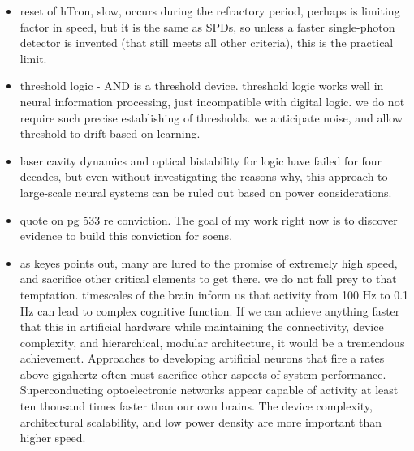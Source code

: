 \documentclass[twocolumn]{article}
\begin{document}
\begin{itemize}
\item reset of hTron, slow, occurs during the refractory period, perhaps is limiting factor in speed, but it is the same as SPDs, so unless a faster single-photon detector is invented (that still meets all other criteria), this is the practical limit.
\item threshold logic - AND is a threshold device. threshold logic works well in neural information processing, just incompatible with digital logic. we do not require such precise establishing of thresholds. we anticipate noise, and allow threshold to drift based on learning. 
\item laser cavity dynamics and optical bistability for logic have failed for four decades, but even without investigating the reasons why, this approach to large-scale neural systems can be ruled out based on power considerations. 
\item \cite{ke1985b} quote on pg 533 re conviction. The goal of my work right now is to discover evidence to build this conviction for soens.
\item as keyes points out, many are lured to the promise of extremely high speed, and sacrifice other critical elements to get there. we do not fall prey to that temptation. timescales of the brain inform us that activity from 100 Hz to 0.1 Hz can lead to complex cognitive function. If we can achieve anything faster that this in artificial hardware while maintaining the connectivity, device complexity, and hierarchical, modular architecture, it would be a tremendous achievement. Approaches to developing artificial neurons that fire a rates above gigahertz often must sacrifice other aspects of system performance. Superconducting optoelectronic networks appear capable of activity at least ten thousand times faster than our own brains. The device complexity, architectural scalability, and low power density are more important than higher speed. 
\end{itemize}

\cite{heza2004}
\end{document}
